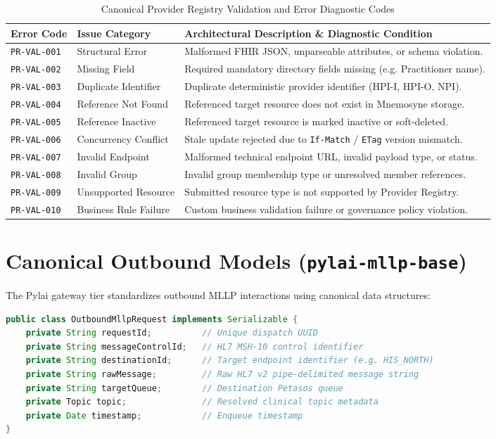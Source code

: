 \begin{table}[htbp]
\centering
\small
\begin{tabularx}{\textwidth}{l l X}
\toprule
\textbf{Error Code} & \textbf{Issue Category} & \textbf{Architectural Description \& Diagnostic Condition} \\
\midrule
\texttt{PR-VAL-001} & Structural Error & Malformed FHIR JSON, unparseable attributes, or schema violation. \\
\texttt{PR-VAL-002} & Missing Field & Required mandatory directory fields missing (e.g. Practitioner name). \\
\texttt{PR-VAL-003} & Duplicate Identifier & Duplicate deterministic provider identifier (HPI-I, HPI-O, NPI). \\
\texttt{PR-VAL-004} & Reference Not Found & Referenced target resource does not exist in Mnemosyne storage. \\
\texttt{PR-VAL-005} & Reference Inactive & Referenced target resource is marked inactive or soft-deleted. \\
\texttt{PR-VAL-006} & Concurrency Conflict & Stale update rejected due to \texttt{If-Match} / \texttt{ETag} version mismatch. \\
\texttt{PR-VAL-007} & Invalid Endpoint & Malformed technical endpoint URL, invalid payload type, or status. \\
\texttt{PR-VAL-008} & Invalid Group & Invalid group membership type or unresolved member references. \\
\texttt{PR-VAL-009} & Unsupported Resource & Submitted resource type is not supported by Provider Registry. \\
\texttt{PR-VAL-010} & Business Rule Failure & Custom business validation failure or governance policy violation. \\
\bottomrule
\end{tabularx}
\caption{Canonical Provider Registry Validation and Error Diagnostic Codes}
\label{tab:info_provider_registry_validation_codes}
\end{table}

\section{Canonical Outbound Models (\texttt{pylai-mllp-base})}

The Pylai gateway tier standardizes outbound MLLP interactions using canonical data structures:

\begin{lstlisting}[language=Java, caption={OutboundMllpRequest Model Definition}]
public class OutboundMllpRequest implements Serializable {
    private String requestId;          // Unique dispatch UUID
    private String messageControlId;   // HL7 MSH-10 control identifier
    private String destinationId;      // Target endpoint identifier (e.g. HIS_NORTH)
    private String rawMessage;         // Raw HL7 v2 pipe-delimited message string
    private String targetQueue;        // Destination Petasos queue
    private Topic topic;               // Resolved clinical topic metadata
    private Date timestamp;            // Enqueue timestamp
}
\end{lstlisting}


